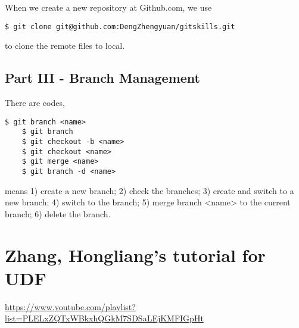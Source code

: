 \documentclass[11pt]{article}
\begin{document}
When we create a new repository at Github.com, we use
\begin{lstlisting}[basicstyle=\small\conso]
    $ git clone git@github.com:DengZhengyuan/gitskills.git
\end{lstlisting}
to clone the remote files to local.

\subsection{Part III - Branch Management}
There are codes,
\begin{lstlisting}[basicstyle=\small\conso]
    $ git branch <name>
    $ git branch
    $ git checkout -b <name> 
    $ git checkout <name> 
    $ git merge <name> 
    $ git branch -d <name>
\end{lstlisting}
means 1) create a new branch; 
2) check the branches; 
3) create and switch to a new branch; 
4) switch to the branch; 
5) merge branch <name> to the current branch; 
6) delete the branch. 


\section{Zhang, Hongliang's tutorial for UDF}
\url{https://www.youtube.com/playlist?list=PLELxZQTxWBkxhQGkM7SDSaLEjKMFIGpHt}
\end{document}

